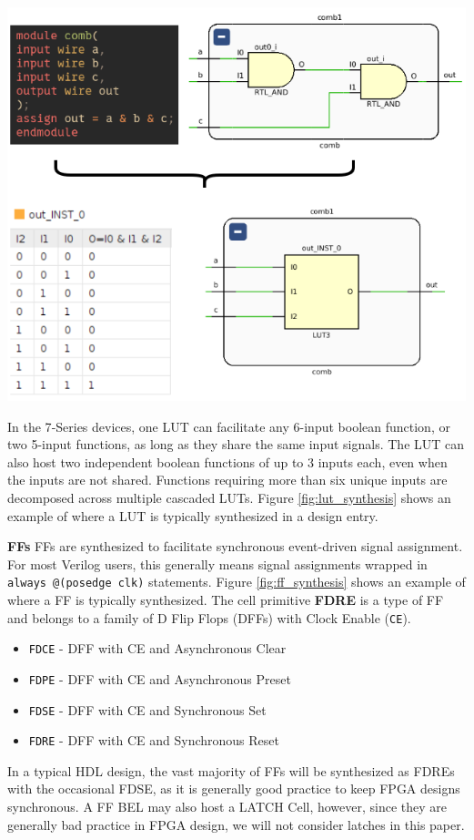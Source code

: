 \begin{multicols}{2}
{
    \centering
    \includegraphics[width=\columnwidth]{figures/lut_synthesis.png}
    \label{fig:lut_synthesis}
}
\vspace{1.0cm}

In the 7‑Series devices, one LUT can facilitate any 6-input boolean function, or two 5-input functions, as long as they share the same input signals.  
The LUT can also host two independent boolean functions of up to 3 inputs each, even when the inputs are not shared.  
Functions requiring more than six unique inputs are decomposed across multiple cascaded LUTs.
Figure \ref{fig:lut_synthesis} shows an example of where a LUT is typically synthesized in a design entry. 


\textbf{FFs} \quad
FFs are synthesized to facilitate synchronous event-driven signal assignment. 
For most Verilog users, this generally means signal assignments wrapped in \texttt{always @(posedge clk)} statements. 
Figure \ref{fig:ff_synthesis} shows an example of where a FF is typically synthesized. 
The cell primitive \textbf{FDRE} is a type of FF and belongs to a family of D Flip Flops (DFFs) with Clock Enable (\texttt{CE}). 
\begin{itemize}
\item \texttt{FDCE} - DFF with CE and Asynchronous Clear
\item \texttt{FDPE} - DFF with CE and Asynchronous Preset
\item \texttt{FDSE} - DFF with CE and Synchronous Set
\item \texttt{FDRE} - DFF with CE and Synchronous Reset
\end{itemize}
In a typical HDL design, the vast majority of FFs will be synthesized as FDREs with the occasional FDSE, as it is generally good practice to keep FPGA designs synchronous. 
A FF BEL may also host a LATCH Cell, however, since they are generally bad practice in FPGA design, we will not consider latches in this paper. 


\end{multicols}
